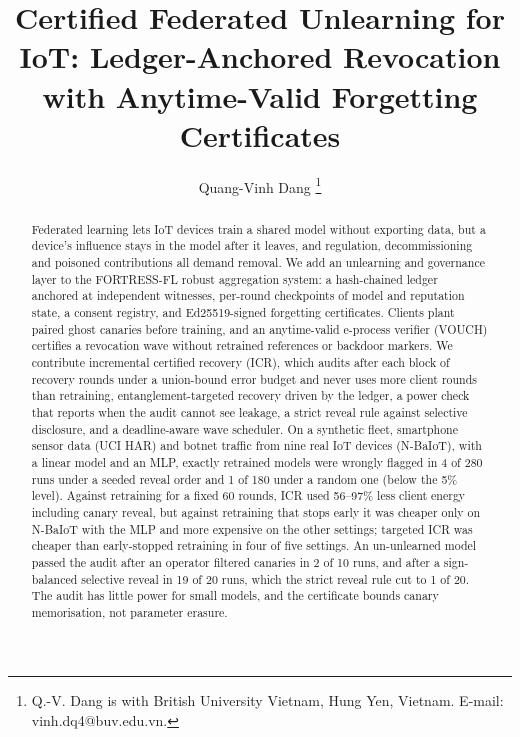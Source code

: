\documentclass[journal]{IEEEtran}
\begin{document}
\title{Certified Federated Unlearning for IoT: Ledger-Anchored Revocation with Anytime-Valid Forgetting Certificates}

\author{Quang-Vinh Dang%
\thanks{Q.-V. Dang is with British University Vietnam, Hung Yen, Vietnam. E-mail: vinh.dq4@buv.edu.vn.}%
}

\maketitle

\begin{abstract}
Federated learning lets IoT devices train a shared model without exporting data, but a device's influence stays in the model after it leaves, and regulation, decommissioning and poisoned contributions all demand removal. We add an unlearning and governance layer to the FORTRESS-FL robust aggregation system: a hash-chained ledger anchored at independent witnesses, per-round checkpoints of model and reputation state, a consent registry, and Ed25519-signed forgetting certificates. Clients plant paired ghost canaries before training, and an anytime-valid e-process verifier (VOUCH) certifies a revocation wave without retrained references or backdoor markers. We contribute incremental certified recovery (ICR), which audits after each block of recovery rounds under a union-bound error budget and never uses more client rounds than retraining, entanglement-targeted recovery driven by the ledger, a power check that reports when the audit cannot see leakage, a strict reveal rule against selective disclosure, and a deadline-aware wave scheduler. On a synthetic fleet, smartphone sensor data (UCI HAR) and botnet traffic from nine real IoT devices (N-BaIoT), with a linear model and an MLP, exactly retrained models were wrongly flagged in 4 of 280 runs under a seeded reveal order and 1 of 180 under a random one (below the 5\% level). Against retraining for a fixed 60 rounds, ICR used 56--97\% less client energy including canary reveal, but against retraining that stops early it was cheaper only on N-BaIoT with the MLP and more expensive on the other settings; targeted ICR was cheaper than early-stopped retraining in four of five settings. An un-unlearned model passed the audit after an operator filtered canaries in 2 of 10 runs, and after a sign-balanced selective reveal in 19 of 20 runs, which the strict reveal rule cut to 1 of 20. The audit has little power for small models, and the certificate bounds canary memorisation, not parameter erasure.
\end{abstract}
\end{document}
